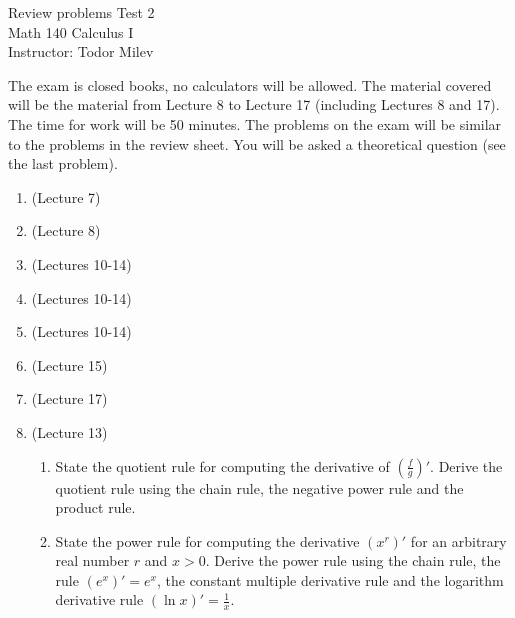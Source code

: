 \documentclass{article}
\begin{document}
\begin{center}
\Large
Review problems Test 2\\ Math 140 Calculus I \\ \normalsize Instructor: Todor Milev
\end{center}


\noindent The exam is closed books, no calculators will be allowed. The material covered will be the material from Lecture 8 to Lecture 17 (including Lectures 8 and 17). The time for work will be 50 minutes. The problems on the exam will be similar to the problems in the review sheet. You will be asked a theoretical question (see the last problem).

\begin{enumerate}
\item (Lecture 7) 
\item (Lecture 8) 
\item (Lectures 10-14)

\item (Lectures 10-14) 
\item (Lectures 10-14) 
\item (Lecture 15) 
\item (Lecture 17) 
\item (Lecture 13)
\begin{enumerate}
\item State the quotient rule for computing the derivative of $\left(\frac{f}{g}\right)'$. Derive the quotient rule 
using the chain rule, the negative power rule and the product rule.
\item State the power rule for computing the derivative
$\left(x^r\right)'$ for an arbitrary real number $r$ and $x>0$. Derive the power rule using the chain rule, the rule $\left(e^{x}\right)'=e^x$, the constant multiple derivative rule and the logarithm derivative rule $(\ln x)'=\frac{1}x$.
\end{enumerate}
\end{enumerate}

\end{document}
